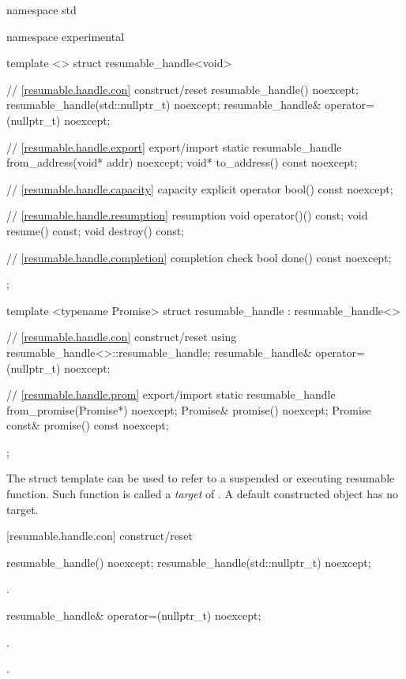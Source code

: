 %
\begin{codeblock}
namespace std {
  namespace experimental {
    template <>
    struct resumable_handle<void>
    {
      // \ref{resumable.handle.con} construct/reset
      resumable_handle() noexcept;		
      resumable_handle(std::nullptr_t) noexcept;
      resumable_handle& operator=(nullptr_t) noexcept;
      
      // \ref{resumable.handle.export} export/import
      static resumable_handle from_address(void* addr) noexcept;		
      void* to_address() const noexcept;
      
      // \ref{resumable.handle.capacity} capacity
      explicit operator bool() const noexcept;
      
      // \ref{resumable.handle.resumption} resumption
      void operator()() const;
      void resume() const;	
      void destroy() const;
      
      // \ref{resumable.handle.completion} completion check
      bool done() const noexcept; 
    };
    
    template <typename Promise>
    struct resumable_handle : resumable_handle<>
    {
      // \ref{resumable.handle.con} construct/reset
      using resumable_handle<>::resumable_handle;
      resumable_handle& operator=(nullptr_t) noexcept;
      
      // \ref{resumable.handle.prom} export/import
      static resumable_handle from_promise(Promise*) noexcept;		
      Promise& promise() noexcept;		
      Promise const& promise() const noexcept;
    };
  }
}
\end{codeblock}

\pnum
The struct template 
can be used to refer to a suspended or executing resumable function.
Such function is called a \textit{target} of .
A default constructed  object has no target.


[resumable.handle.con]{ construct/reset}
\begin{itemdecl}
  resumable_handle() noexcept;		
  resumable_handle(std::nullptr_t) noexcept;
\end{itemdecl}
\begin{itemdescr}
  \pnum\postconditions {}.
\end{itemdescr}

\begin{itemdecl}
  resumable_handle& operator=(nullptr_t) noexcept;
\end{itemdecl}
\begin{itemdescr}
	\pnum\postconditions {}.
  
  \pnum\returns {}.
\end{itemdescr}

